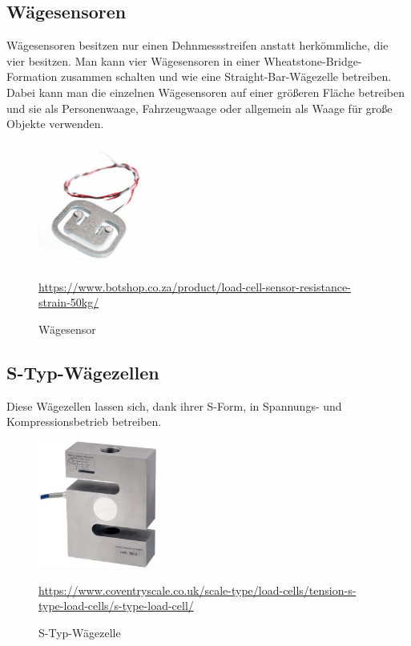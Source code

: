\subsection{Wägesensoren}
Wägesensoren besitzen nur einen Dehnmessstreifen anstatt herkömmliche, die vier besitzen. Man kann vier Wägesensoren in einer Wheatstone-Bridge-Formation zusammen schalten und wie eine Straight-Bar-Wägezelle betreiben. Dabei kann man die einzelnen Wägesensoren auf einer größeren Fläche betreiben und sie als Personenwaage, Fahrzeugwaage oder allgemein als Waage für große Objekte verwenden.
\begin{figure}[H]
    \center
    \includegraphics[width=4cm]{Bilder/waegezelle-waegesensor.jpg}\\
    \caption{Wägesensor}
    \begin{center} \quelle\url{https://www.botshop.co.za/product/load-cell-sensor-resistance-strain-50kg/} \end{center}
\end{figure}
\subsection{S-Typ-Wägezellen}
Diese Wägezellen lassen sich, dank ihrer S-Form, in Spannungs- und Kompressionsbetrieb betreiben.
\begin{figure}[H]
    \center
    \includegraphics[width=4cm]{Bilder/waegezelle-s_typ.jpg}\\
    \caption{S-Typ-Wägezelle}
    \begin{center} \quelle\url{https://www.coventryscale.co.uk/scale-type/load-cells/tension-s-type-load-cells/s-type-load-cell/} \end{center}
\end{figure}
\newpage
